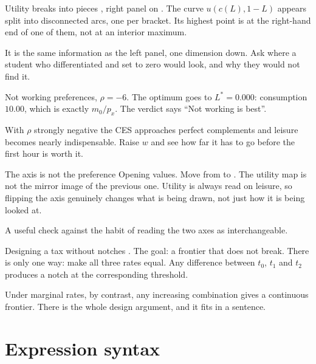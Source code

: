 \documentclass[11pt,a4paper]{appletmanual}
\begin{document}
\begin{activity}{Utility breaks into pieces}
\amset {}, right panel on .
\amexp The curve $u(c(L), 1-L)$ appears split into disconnected arcs, one per
bracket. Its highest point is at the right-hand end of one of them, not at an
interior maximum.
\par\smallskip
It is the same information as the left panel, one dimension down. Ask where a
student who differentiated and set to zero would look, and why they would not
find it.
\end{activity}

\begin{activity}{Not working}
\amset {} preferences, $\rho = -6$.
\amexp The optimum goes to $L^\ast = 0.000$: consumption $10.00$, which is
exactly $m_0/p_x$. The verdict says ``Not working is best''.
\par\smallskip
With $\rho$ strongly negative the CES approaches perfect complements and
leisure becomes nearly indispensable. Raise $w$ and see how far it has to go
before the first hour is worth it.
\end{activity}

\begin{activity}{The axis is not the preference}
\amset Opening values. Move  from  to
.
\amexp The utility map is not the mirror image of the previous one. Utility is
always read on leisure, so flipping the axis genuinely changes what is being
drawn, not just how it is being looked at.
\par\smallskip
A useful check against the habit of reading the two axes as interchangeable.
\end{activity}

\begin{activity}{Designing a tax without notches}
\amset {}. The goal: a frontier that does not break.
\amexp There is only one way: make all three rates equal. Any difference
between $t_0$, $t_1$ and $t_2$ produces a notch at the corresponding threshold.
\par\smallskip
Under marginal rates, by contrast, any increasing combination gives a
continuous frontier. There is the whole design argument, and it fits in a
sentence.
\end{activity}

\section{Expression syntax}
\end{document}
